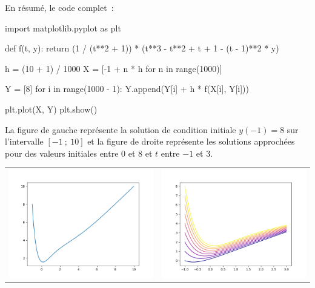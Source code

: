 	En résumé, le code complet~:
	\begin{pythoncode}
		import matplotlib.pyplot as plt
		
		def f(t, y):
			return (1 / (t**2 + 1)) * (t**3 - t**2 + t + 1 - (t - 1)**2 * y)
		
		h = (10 + 1) / 1000
		X = [-1 + n * h for n in range(1000)]
		
		Y = [8]
		for i in range(1000 - 1):
			Y.append(Y[i] + h * f(X[i], Y[i]))
		
		plt.plot(X, Y)
		plt.show()
	\end{pythoncode}
	
	La figure de gauche représente la solution de condition initiale $y(-1) = 8$ sur l'intervalle $[-1~;\ 10]$ et la figure de droite représente les solutions approchées pour des valeurs initiales entre $0$ et $8$ et $t$ entre $-1$ et $3$.
	
	\begin{tabular}{cc}
		\includegraphics[scale=0.50]{images/Figure_5.png} &
		\includegraphics[scale=0.50]{images/Figure_6.png} \\
	\end{tabular}

